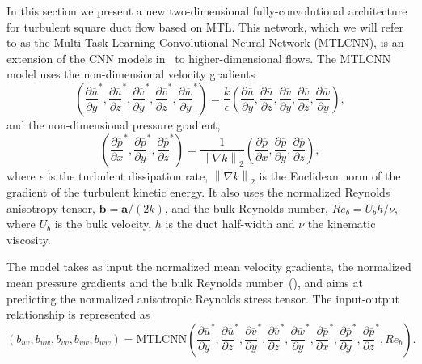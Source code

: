 \documentclass[11pt]{article}
\numberwithin{equation}{section}
\theoremstyle{plain}
\theoremstyle{definition}
\begin{document}
In this section we present a new two-dimensional fully-convolutional architecture for turbulent square duct flow based on MTL. This network, which we will refer to as the Multi-Task Learning Convolutional Neural Network (MTLCNN), is an extension of the CNN models in~\cite{borde2021convolutional} to higher-dimensional flows. 
The MTLCNN model uses the non-dimensional velocity gradients
\begin{equation}
\left(\frac{\partial \overline{u}}{\partial y}^{*},\frac{\partial \overline{u}}{\partial z}^{*},\frac{\partial \overline{v}}{\partial y}^{*},\frac{\partial \overline{v}}{\partial z}^{*},\frac{\partial \overline{w}}{\partial y}^{*}\right) = \frac{k}{\epsilon}\left(\frac{\partial \overline{u}}{\partial y},\frac{\partial \overline{u}}{\partial z},\frac{\partial \overline{v}}{\partial y},\frac{\partial \overline{v}}{\partial z},\frac{\partial \overline{w}}{\partial y}\right),
\end{equation}
and the non-dimensional pressure gradient,
\begin{equation}
    \left(\frac{\partial\overline{p}}{\partial x}^{*},\frac{\partial\overline{p}}{\partial y}^{*},\frac{\partial\overline{p}}{\partial z}^{*}\right)=\dfrac{1}{\left\|\nabla k\right\|_{2}}\left(\frac{\partial\overline{p}}{\partial x},\frac{\partial \overline{p}}{\partial y},\frac{\partial\overline{p}}{\partial z}\right),
\end{equation}
where $\epsilon$ is the turbulent dissipation rate, $\left\|\nabla k \right\|_{2}$ is the Euclidean norm of the gradient of the turbulent kinetic energy. It also uses the normalized Reynolds anisotropy tensor, $\mathbf{b}=\mathbf{a}/(2k)$, and the bulk Reynolds number, $Re_{b} = U_{b}h/\nu$, where $U_{b}$ is the bulk velocity, $h$ is the duct half-width and $\nu$ the kinematic viscosity.

The model takes as input the normalized mean velocity gradients, the normalized mean pressure gradients and the bulk Reynolds number~(\cite{fang2018deep}), and aims at predicting the normalized anisotropic Reynolds stress tensor. The input-output relationship is represented as
\begin{equation}
    \left(b_{uv},b_{uw},b_{vv},b_{vw},b_{ww}\right)=\text{MTLCNN}\left(\frac{\partial \overline{u}}{\partial y}^{*},\frac{\partial \overline{u}}{\partial z}^{*},\frac{\partial \overline{v}}{\partial y}^{*},\frac{\partial \overline{v}}{\partial z}^{*},\frac{\partial \overline{w}}{\partial y}^{*},\frac{\partial\overline{p}}{\partial x}^{*},\frac{\partial\overline{p}}{\partial y}^{*},\frac{\partial\overline{p}}{\partial z}^{*},Re_{b}\right).
    \label{eq:CNN_eq}
\end{equation}
\end{document}
